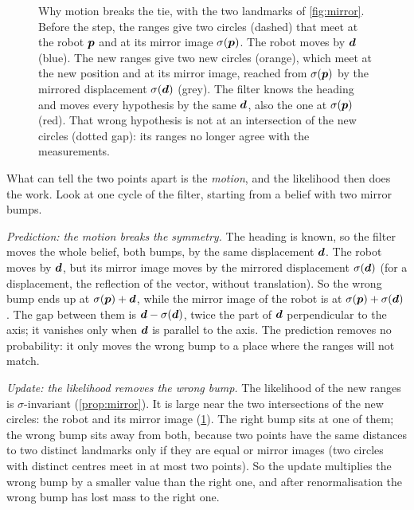 \begin{figure}[ht]
\caption{Why motion breaks the tie, with the two landmarks of
\cref{fig:mirror}. Before the step, the ranges give two circles (dashed)
that meet at the robot $\bm{p}$ and at its mirror image $\sigma(\bm{p})$. The
robot moves by $\bm{d}$ (blue). The new ranges give two new circles
(orange), which meet at the new position and at its mirror image, reached
from $\sigma(\bm{p})$ by the mirrored displacement $\sigma(\bm{d})$ (grey).
The filter knows the heading and moves every hypothesis by the same
$\bm{d}$, also the one at $\sigma(\bm{p})$ (red). That wrong hypothesis is
not at an intersection of the new circles (dotted gap): its ranges no
longer agree with the measurements.}
\label{fig:mirrormotion}
\end{figure}

What can tell the two points apart is the \emph{motion}, and the
likelihood then does the work. Look at one cycle of the filter, starting
from a belief with two mirror bumps.

\emph{Prediction: the motion breaks the symmetry.} The heading is known,
so the filter moves the whole belief, both bumps, by the same
displacement $\bm{d}$. The robot moves by $\bm{d}$, but its mirror
image moves by the mirrored displacement $\sigma(\bm{d})$ (for a
displacement, the reflection of the vector, without translation). So the
wrong bump ends up at $\sigma(\bm{p})+\bm{d}$, while the mirror image of the
robot is at $\sigma(\bm{p})+\sigma(\bm{d})$. The gap between them is
$\bm{d}-\sigma(\bm{d})$, twice the part of $\bm{d}$ perpendicular to
the axis; it vanishes only when $\bm{d}$ is parallel to the axis. The
prediction removes no probability: it only moves the wrong bump to a
place where the ranges will not match.

\emph{Update: the likelihood removes the wrong bump.} The likelihood of
the new ranges is $\sigma$-invariant (\cref{prop:mirror}). It is large
near the two intersections of the new circles: the robot and its mirror
image (\cref{fig:mirrormotion}). The right bump sits at one of them; the
wrong bump sits away from both, because two points have the same
distances to two distinct landmarks only if they are equal or mirror
images (two circles with distinct centres meet in at most two points). So
the update multiplies the wrong bump by a smaller value than the right
one, and after renormalisation the wrong bump has lost mass to the right
one.

